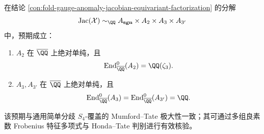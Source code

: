 \begin{conjecture}[等型因子的绝对单纯与内自同态环极小化]\label{conj:fold-gauge-anomaly-isotypic-absolute-simplicity}
在结论 \ref{con:fold-gauge-anomaly-jacobian-equivariant-factorization} 的分解
\[
\mathrm{Jac}(\mathcal X)\sim_{\QQ}A_{\mathbf{sgn}}\times A_2\times A_3\times A_{3'}
\]
中，预期成立：
\begin{enumerate}
  \item \(A_2\) 在 \(\overline{\QQ}\) 上绝对单纯，且
  \[
  \operatorname{End}^0_{\overline{\QQ}}(A_2)=\QQ(\zeta_3).
  \]
  \item \(A_3,A_{3'}\) 在 \(\overline{\QQ}\) 上绝对单纯，且
  \[
  \operatorname{End}^0_{\overline{\QQ}}(A_3)=\operatorname{End}^0_{\overline{\QQ}}(A_{3'})=\QQ.
  \]
\end{enumerate}
该预期与通用简单分歧 \(S_4\)-覆盖的 Mumford--Tate 极大性一致；其可通过多组良素数 Frobenius 特征多项式与 Honda--Tate 判别进行有效核验。
\end{conjecture}

\endinput
